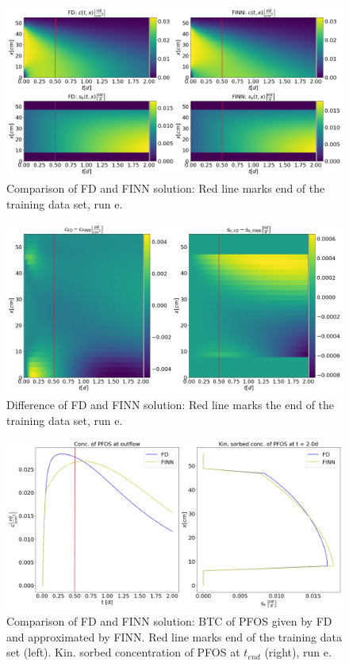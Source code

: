 \begin{figure}[h]
	\centering
	\includegraphics[width=\textwidth]{images/res_ov_synt_FGR_500_m.png}
\caption[Comparison of FD and FINN solution, run e]{Comparison of FD and FINN solution: Red line marks end of the training data set, run e.}
\label{fig:res_ov_synt_FGR_500_m}
\end{figure}
\begin{figure}[h]
	\centering
	\includegraphics[width=\textwidth]{images/res_diff_synt_FGR_500_m.png}
\caption[Difference of FD and FINN solution, run e]{Difference of FD and FINN solution: Red line marks the end of the training data set, run e.}
\label{fig:res_diff_synt_FGR_500_m}
\end{figure}
\begin{figure}[h]
	\centering
	\includegraphics[width=\textwidth]{images/res_btc_synt_FGR_500_m.png}
\caption[Comparison of FD and FINN BTC, run e]{Comparison of FD and FINN solution: BTC of PFOS given by FD and approximated by FINN. Red line marks end of the training data set (left). Kin. sorbed concentration of PFOS at $t_{end}$ (right), run e.}
\label{fig:res_btc_synt_FGR_500_m}
\end{figure}

